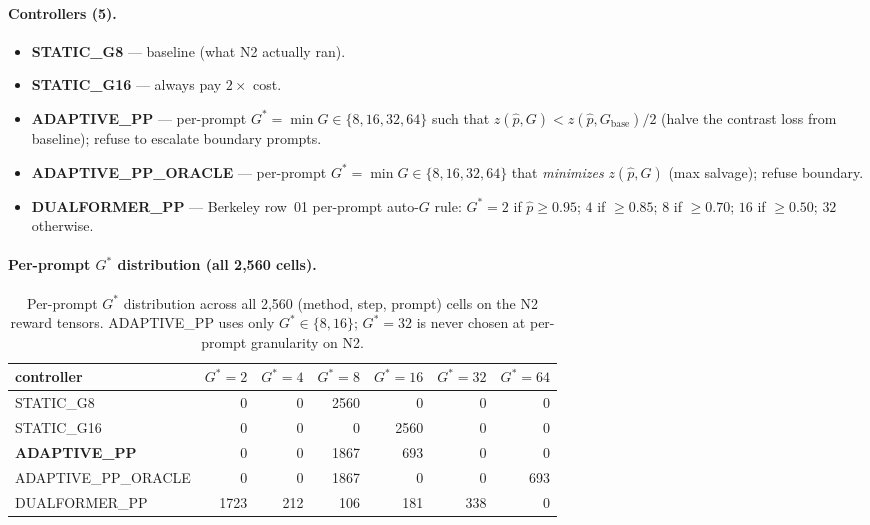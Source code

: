 \documentclass{article}
\begin{document}
\paragraph{Controllers (5).}

\begin{itemize}
\item \textbf{STATIC\_G8} — baseline (what N2 actually ran).
\item \textbf{STATIC\_G16} — always pay $2\times$ cost.
\item \textbf{ADAPTIVE\_PP} — per-prompt $G^* = \min G \in \{8,16,32,64\}$
      such that $z(\hat{p}, G) < z(\hat{p}, G_{\mathrm{base}}) / 2$
      (halve the contrast loss from baseline); refuse to escalate boundary
      prompts.
\item \textbf{ADAPTIVE\_PP\_ORACLE} — per-prompt $G^* = \min G \in \{8,16,32,64\}$
      that \emph{minimizes} $z(\hat{p}, G)$ (max salvage); refuse boundary.
\item \textbf{DUALFORMER\_PP} — Berkeley row~01 per-prompt auto-$G$ rule:
      $G^*=2$ if $\hat{p}\geq 0.95$; $4$ if $\geq 0.85$; $8$ if $\geq 0.70$;
      $16$ if $\geq 0.50$; $32$ otherwise.
\end{itemize}

\paragraph{Per-prompt $G^*$ distribution (all 2,560 cells).}

\begin{table}[h]
\centering\small
\caption{Per-prompt $G^*$ distribution across all 2,560 (method, step, prompt)
cells on the N2 reward tensors. ADAPTIVE\_PP uses only $G^* \in \{8, 16\}$;
$G^*=32$ is never chosen at per-prompt granularity on N2.}
\label{tab:p7-iter131-gstar-dist}
\begin{tabular}{lrrrrrr}
\toprule
controller & $G^*=2$ & $G^*=4$ & $G^*=8$ & $G^*=16$ & $G^*=32$ & $G^*=64$ \\
\midrule
STATIC\_G8               & 0    & 0    & 2560 & 0    & 0    & 0    \\
STATIC\_G16              & 0    & 0    & 0    & 2560 & 0    & 0    \\
\textbf{ADAPTIVE\_PP}    & 0    & 0    & 1867 & 693  & 0    & 0    \\
ADAPTIVE\_PP\_ORACLE     & 0    & 0    & 1867 & 0    & 0    & 693  \\
DUALFORMER\_PP           & 1723 & 212  & 106  & 181  & 338  & 0    \\
\bottomrule
\end{tabular}
\end{table}
\end{document}
